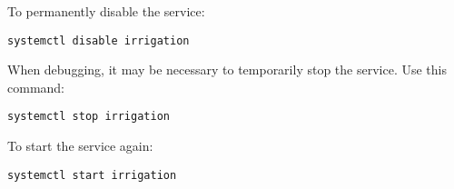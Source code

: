 To permanently disable the service:

\begin{verbatim}
systemctl disable irrigation
\end{verbatim}

When debugging, it may be necessary to temporarily stop the service.  Use this 
command:

\begin{verbatim}
systemctl stop irrigation
\end{verbatim}

To start the service again:

\begin{verbatim}
systemctl start irrigation
\end{verbatim}



